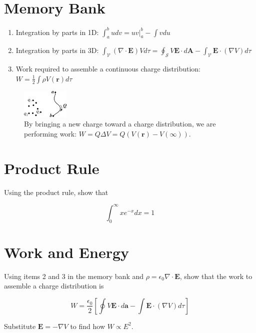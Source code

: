 \documentclass[12pt]{article}
\begin{document}
\maketitle

\section{Memory Bank}

\begin{enumerate}
\item Integration by parts in 1D: $\int_a^b u dv = uv|_a^b - \int v du$
\item Integration by parts in 3D: $\int_{\mathcal{V}} (\nabla \cdot \mathbf{E}) V d\tau = \oint_{\mathcal{S}} V \mathbf{E} \cdot d\mathbf{A} - \int_{\mathcal{V}} \mathbf{E} \cdot (\nabla V) d\tau$
\item Work required to assemble a continuous charge distribution: $W = \frac{1}{2} \int \rho V(\mathbf{r}) d\tau$
\end{enumerate}

\begin{figure}[ht]
\centering
\includegraphics[width=0.2\textwidth]{figures/2_39.jpg}
\caption{\label{fig:charges} By bringing a new charge toward a charge distribution, we are performing work: $W = Q\Delta V = Q (V(\mathbf{r}) - V(\infty))$.}
\end{figure}

\section{Product Rule}

Using the product rule, show that

\begin{equation}
\int_0^{\infty} x e^{-x} dx = 1
\end{equation}

\vspace{1cm}

\section{Work and Energy}

Using items 2 and 3 in the memory bank and $\rho = \epsilon_0 \nabla \cdot \mathbf{E}$, show that the work to assemble a charge distribution is

\begin{equation}
W = \frac{\epsilon_0}{2} \left[ \oint V \mathbf{E} \cdot d\mathbf{a} - \int \mathbf{E} \cdot (\nabla V) d\tau \right]
\end{equation}

Substitute $\mathbf{E} = -\nabla V$ to find how $W \propto E^2$.
\end{document}
